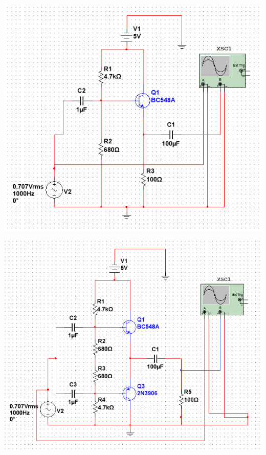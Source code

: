 \documentclass[12pt]{article}
\begin{document}
\begin{minipage}{0.5\textwidth}
    \centering
    \includegraphics[width=\textwidth]{Class_B_Diagram.jpg}
\end{minipage}
\begin{minipage}{0.5\textwidth}
    \centering
    \includegraphics[width=\textwidth]{Class_B_push-pull_Diagram.jpg}
\end{minipage}
\vspace{1cm}
\end{document}
